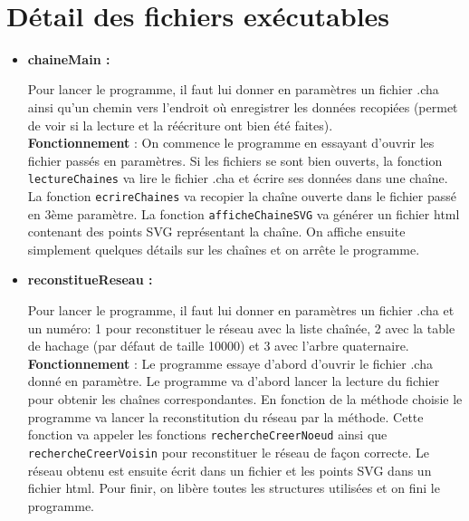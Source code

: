 \documentclass[12pt]{extarticle}
\begin{document}
\\ 
\newpage
\section*{Détail des fichiers exécutables}
\begin{itemize}[label=-]
    \item \textbf{chaineMain :} \\
    Pour lancer le programme, il faut lui donner en paramètres un fichier .cha ainsi qu'un chemin vers l'endroit où enregistrer les données recopiées (permet de voir si la lecture et la réécriture ont bien été faites). \\
    \textbf{Fonctionnement} : On commence le programme en essayant d'ouvrir les fichier passés en paramètres. Si les fichiers se sont bien ouverts, la fonction \texttt{lectureChaines} va lire le fichier .cha et écrire ses données dans une chaîne. La fonction \texttt{ecrireChaines} va recopier la chaîne ouverte dans le fichier passé en 3ème paramètre. La fonction \texttt{afficheChaineSVG} va générer un fichier html contenant des points SVG représentant la chaîne. On affiche ensuite simplement quelques détails sur les chaînes et on arrête le programme.
    \\
    \item \textbf{reconstitueReseau :} \\
    Pour lancer le programme, il faut lui donner en paramètres un fichier .cha et un numéro: 1 pour reconstituer le réseau avec la liste chaînée, 2 avec la table de hachage (par défaut de taille 10000) et 3 avec l'arbre quaternaire. \\
    \textbf{Fonctionnement} : Le programme essaye d'abord d'ouvrir le fichier .cha donné en paramètre. Le programme va d'abord lancer la lecture du fichier pour obtenir les chaînes correspondantes. En fonction de la méthode choisie le programme va lancer la reconstitution du réseau par la méthode. Cette fonction va appeler les fonctions \texttt{rechercheCreerNoeud} ainsi que \texttt{rechercheCreerVoisin} pour reconstituer le réseau de façon correcte. Le réseau obtenu est ensuite écrit dans un fichier et les points SVG dans un fichier html.
    Pour finir, on libère toutes les structures utilisées et on fini le programme.
    \\


\end{itemize}
\end{document}
